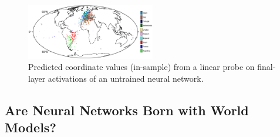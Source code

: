\documentclass{article}
\theoremstyle{plain}
\theoremstyle{definition}
\theoremstyle{remark}
\begin{document}


\begin{figure}

{\centering \includegraphics[width=0.5\textwidth]{results/figures/map.png}

}

\caption{\label{fig-map}Predicted coordinate values (in-sample) from a linear probe on final-layer activations of an untrained neural network.}

\end{figure}

\subsection{Are Neural Networks Born with World Models?}\label{example-deep-learning}
\end{document}
